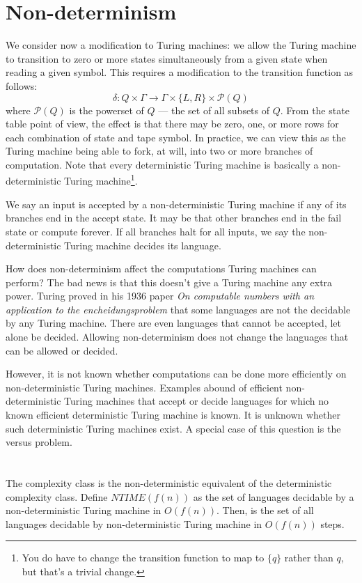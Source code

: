 \documentclass{iansnotes}
\begin{document}
\section{Non-determinism}
  \label{sect:nondet}
  We consider now a modification to Turing machines: we allow the Turing machine to transition to zero or more states simultaneously from a given state when reading a given symbol.
  This requires a modification to the transition function as follows:
   \[ \delta: Q \times \Gamma \rightarrow \Gamma \times \{ L, R \} \times \mathcal{P}(Q) \]
   where \( \mathcal{P}(Q) \) is the powerset of \( Q \) --- the set of all subsets of \( Q \).
  From the state table point of view, the effect is that there may be zero, one, or more rows for each combination of state and tape symbol.
  In practice, we can view this as the Turing machine being able to fork, at will, into two or more branches of computation.
  Note that every deterministic Turing machine is basically a non-deterministic Turing machine\footnote{You do have to change the transition function to map to \( \{ q \} \) rather than \( q \), but that's a trivial change.}.

  We say an input is accepted by a non-deterministic Turing machine if any of its branches end in the accept state.
  It may be that other branches end in the fail state or compute forever.
  If all branches halt for all inputs, we say the non-deterministic Turing machine decides its language.

  How does non-determinism affect the computations Turing machines can perform?
  The bad news is that this doesn't give a Turing machine any extra power.
  Turing proved in his 1936 paper \emph{On computable numbers with an application to the encheidungsproblem} that some languages are not the decidable by any Turing machine.
  There are even languages that cannot be accepted, let alone be decided.
  Allowing non-determinism does not change the languages that can be allowed or decided.

  However, it is not known whether computations can be done more efficiently on non-deterministic Turing machines.
  Examples abound of efficient non-deterministic Turing machines that accept or decide languages for which no known efficient deterministic Turing machine is known.
  It is unknown whether such deterministic Turing machines exist.
  A special case of this question is the  versus  problem.


\section{}
  The  complexity class is the non-deterministic equivalent of the deterministic  complexity class.
  Define \( NTIME(f(n)) \) as the set of languages decidable by a non-deterministic Turing machine in \( O(f(n)) \).
  Then,  is the set of all languages decidable by non-deterministic Turing machine in \( O(f(n)) \) steps.
\end{document}
